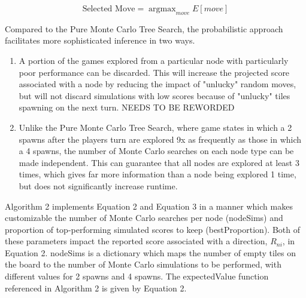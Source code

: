 \documentclass{article}
\DeclareMathOperator*{\argmax}{argmax}
\begin{document}
\begin{equation}
  \textrm{Selected Move} = \argmax_{move} E[move]
\end{equation}

Compared to the Pure Monte Carlo Tree Search, the probabilistic approach facilitates more sophisticated inference in two ways. 

\begin{enumerate}
  \item A portion of the games explored from a particular node with particularly poor performance can be discarded.  This will increase the projected score associated with a node by reducing the impact of "unlucky" random moves, but will not discard simulations with low scores because of "unlucky" tiles spawning on the next turn. NEEDS TO BE REWORDED
  \item Unlike the Pure Monte Carlo Tree Search, where game states in which a 2 spawns after the players turn are explored 9x as frequently as those in which a 4 spawns, the number of Monte Carlo searches on each node type can be made independent.  This can guarantee that all nodes are explored at least 3 times, which gives far more information than a node being explored 1 time, but does not significantly increase runtime.  
 
\end{enumerate}

Algorithm 2 implements Equation 2 and Equation 3 in a manner which makes customizable the number of Monte Carlo searches per node (nodeSims) and proportion of top-performing simulated scores to keep (bestProportion).  Both of these parameters impact the reported score associated with a direction, $R_{ni}$, in Equation 2.  nodeSims is a dictionary which maps the number of empty tiles on the board to the number of Monte Carlo simulations to be performed, with different values for 2 spawns and 4 spawns.  The expectedValue function referenced in Algorithm 2 is given by Equation 2.
\end{document}
